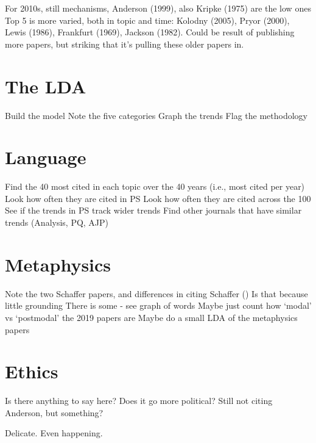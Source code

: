 \documentclass[
  10pt,
  letterpaper,
  DIV=11,
  numbers=noendperiod,
  twoside]{scrartcl}
\begin{document}
For 2010s, still mechanisms, Anderson (1999), also Kripke (1975) are the
low ones Top 5 is more varied, both in topic and time: Kolodny (2005),
Pryor (2000), Lewis (1986), Frankfurt (1969), Jackson (1982). Could be
result of publishing more papers, but striking that it's pulling these
older papers in.

\section{The LDA}\label{the-lda}

Build the model Note the five categories Graph the trends Flag the
methodology

\section{Language}\label{language}

Find the 40 most cited in each topic over the 40 years (i.e., most cited
per year) Look how often they are cited in PS Look how often they are
cited across the 100 See if the trends in PS track wider trends Find
other journals that have similar trends (Analysis, PQ, AJP)

\section{Metaphysics}\label{metaphysics}

Note the two Schaffer papers, and differences in citing Schaffer
() Is that because little
grounding There is some - see graph of words Maybe just count how
`modal' vs `postmodal' the 2019 papers are Maybe do a small LDA of the
metaphysics papers

\section{Ethics}\label{ethics}

Is there anything to say here? Does it go more political? Still not
citing Anderson, but something?

Delicate. Even happening.
\end{document}
